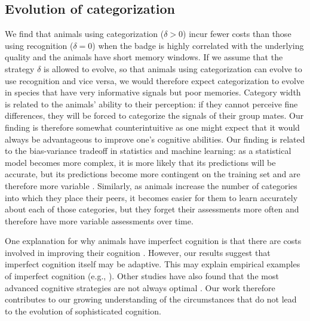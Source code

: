 \subsection*{Evolution of categorization }

We find that animals using categorization ($\delta>0$) incur fewer costs than those using recognition ($\delta=0$) when the badge is highly correlated with the underlying quality and the animals have short memory windows. If we assume that the strategy $\delta$ is allowed to evolve, so that animals using categorization can evolve to use recognition and vice versa, we would therefore expect categorization to evolve in species that have very informative signals but poor memories. Category width is related to the animals' ability to their perception: if they cannot perceive fine differences, they will be forced to categorize the signals of their group mates. Our finding is therefore somewhat counterintuitive as one might expect that it would always be advantageous to improve one's cognitive abilities. Our finding is related to the bias-variance tradeoff in statistics and machine learning: as a statistical model becomes more complex, it is more likely that its predictions will be accurate, but its predictions become more contingent on the training set and are therefore more variable \citep{Domingos:2000cr,Briscoe:2011nx}. Similarly, as animals increase the number of categories into which they place their peers, it becomes easier for them to learn accurately about each of those categories, but they forget their assessments more often and therefore have more variable assessments over time. %

One explanation for why animals have imperfect cognition is that there are costs involved in improving their cognition \citep{Dunbar:1992ys,Laughlin:1998ly,Laughlin:2001qf,Gavrilets:2006fk,MacIver:2010ve}. However, our results suggest that imperfect cognition itself may be adaptive. This may explain empirical examples of imperfect cognition (e.g., \citep{Kikuchi:2010ys}).
Other studies have also found that the most advanced cognitive strategies are not always optimal \citep{Stephens:1991fk,Kerr:2003vn,Dunlap:2009vn}. Our work therefore contributes to our growing understanding of the circumstances that do not lead to the evolution of sophisticated cognition.

